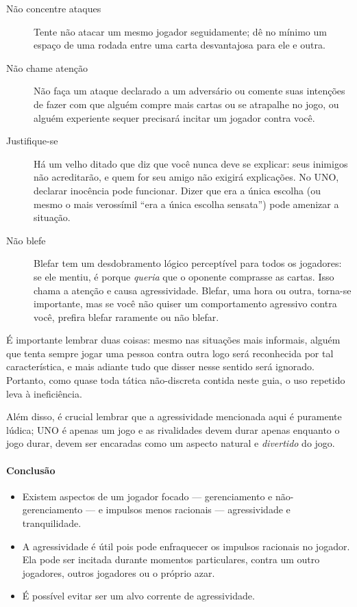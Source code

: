\begin{description}
\item[Não concentre ataques]{Tente não atacar um mesmo jogador seguidamente; dê no mínimo um espaço de uma rodada entre uma carta desvantajosa para ele e outra.}
\item[Não chame atenção]{Não faça um ataque declarado a um adversário ou comente suas intenções de fazer com que alguém compre mais cartas ou se atrapalhe no jogo, ou alguém experiente sequer precisará incitar um jogador contra você.}
\item[Justifique-se]{Há um velho ditado que diz que você nunca deve se explicar: seus inimigos não acreditarão, e quem for seu amigo não exigirá explicações. No UNO, declarar inocência pode funcionar. Dizer que era a única escolha (ou mesmo o mais verossímil ``era a única escolha sensata'') pode amenizar a situação.}
\item[Não blefe]{Blefar tem um desdobramento lógico perceptível para todos os jogadores: se ele mentiu, é porque \textit{queria} que o oponente comprasse as cartas. Isso chama a atenção e causa agressividade. Blefar, uma hora ou outra, torna-se importante, mas se você não quiser um comportamento agressivo contra você, prefira blefar raramente ou não blefar.}
\end{description}

É importante lembrar duas coisas: mesmo nas situações mais informais, alguém que tenta sempre jogar uma pessoa contra outra logo será reconhecida por tal característica, e mais adiante tudo que disser nesse sentido será ignorado. Portanto, como quase toda tática não-discreta contida neste guia, o uso repetido leva à ineficiência.

Além disso, é crucial lembrar que a agressividade mencionada aqui é puramente lúdica; UNO é apenas um jogo e as rivalidades devem durar apenas enquanto o jogo durar, devem ser encaradas como um aspecto natural e \textit{divertido} do jogo.

\paragraph{Conclusão}

\begin{itemize}
\item{Existem aspectos de um jogador focado --- gerenciamento e não-gerenciamento --- e impulsos menos racionais --- agressividade e tranquilidade.}
\item{A agressividade é útil pois pode enfraquecer os impulsos racionais no jogador. Ela pode ser incitada durante momentos particulares, contra um outro jogadores, outros jogadores ou o próprio azar.}
\item{É possível evitar ser um alvo corrente de agressividade.}
\end{itemize}

